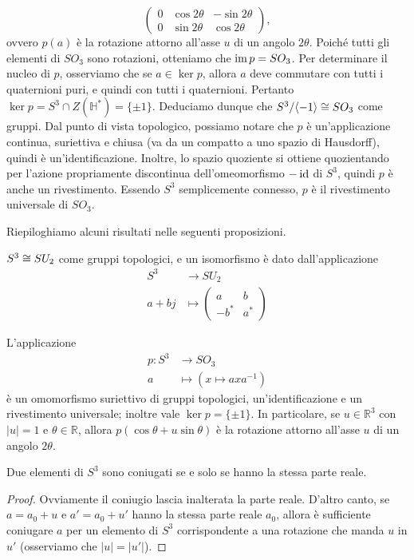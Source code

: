 \begin{itemize}
$$\begin{pmatrix}
0&\cos2\theta&-\sin2\theta\\
0&\sin2\theta&\cos2\theta
\end{pmatrix},
$$
ovvero $p(a)$ è la rotazione attorno all'asse $u$ di un angolo $2\theta$. Poiché tutti gli elementi di $SO_3$ sono rotazioni, otteniamo che $\operatorname{im} p=SO_3$. Per determinare il nucleo di $p$, osserviamo che se $a\in\ker p$, allora $a$ deve commutare con tutti i quaternioni puri, e quindi con tutti i quaternioni. Pertanto $\ker p=S^3\cap Z(\mathbb{H}^*)=\{\pm 1\}$. Deduciamo dunque che $S^3/\langle -1\rangle\cong SO_3$ come gruppi. Dal punto di vista topologico, possiamo notare che $p$ è un'applicazione continua, suriettiva e chiusa (va da un compatto a uno spazio di Hausdorff), quindi è un'identificazione. Inoltre, lo spazio quoziente si ottiene quozientando per l'azione propriamente discontinua dell'omeomorfismo $-\operatorname{id}$ di $S^3$, quindi $p$ è anche un rivestimento. Essendo $S^3$ semplicemente connesso, $p$ è il rivestimento universale di $SO_3$.
\end{itemize}

Riepiloghiamo alcuni risultati nelle seguenti proposizioni.

\begin{proposition}
$S^3\cong SU_2$ come gruppi topologici, e un isomorfismo è dato dall'applicazione
\begin{align*}
S^3&\longrightarrow SU_2\\
a+bj&\longmapsto \begin{pmatrix*}a&b\\-b^*&a^*\end{pmatrix*}
\end{align*}
\end{proposition}

\begin{proposition}
L'applicazione
\begin{align*}
p:S^3&\longrightarrow SO_3\\
a&\longmapsto(x\longmapsto axa^{-1})
\end{align*}
è un omomorfismo suriettivo di gruppi topologici, un'identificazione e un rivestimento universale; inoltre vale $\ker p=\{\pm 1\}$. In particolare, se $u\in\mathbb{R}^3$ con $|u|=1$ e $\theta\in\mathbb{R}$, allora $p(\cos\theta+u\sin\theta)$ è la rotazione attorno all'asse $u$ di un angolo $2\theta$.
\end{proposition}

\begin{corollary}
Due elementi di $S^3$ sono coniugati se e solo se hanno la stessa parte reale.
\end{corollary}
\begin{proof}
Ovviamente il coniugio lascia inalterata la parte reale. D'altro canto, se $a=a_0+u$ e $a'=a_0+u'$ hanno la stessa parte reale $a_0$, allora è sufficiente coniugare $a$ per un elemento di $S^3$ corrispondente a una rotazione che manda $u$ in $u'$ (osserviamo che $|u|=|u'|$).
\end{proof}

